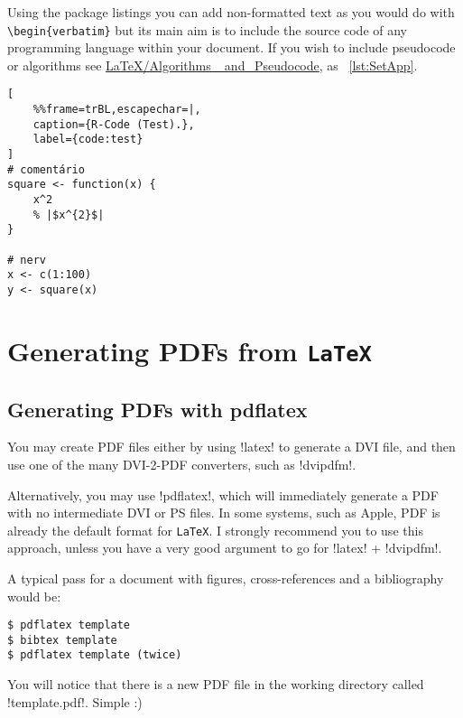 Using the package listings you can add non-formatted text as you would do with \verb!\begin{verbatim}! but its main aim is to include the source code of any programming language within your document. If you wish to include pseudocode or algorithms see \href{http://en.wikibooks.org/wiki/LaTeX/Algorithms_and_Pseudocode}{LaTeX/Algorithms\_ and\_Pseudocode}, as \lstlistingname ~\ref{lst:SetApp}.


\begin{minipage}{\textwidth}
\lstset{language=R,numbers=left}
\begin{lstlisting}[
    %%frame=trBL,escapechar=|,
    caption={R-Code (Test).},
    label={code:test}
]
# comentário
square <- function(x) {
    x^2
    % |$x^{2}$|
}

# nerv
x <- c(1:100)
y <- square(x)
\end{lstlisting}
\end{minipage}
\section{Generating PDFs from \texttt{LaTeX}} %
\label{sec:generating_pdfs_from_latex}

\subsection{Generating PDFs with pdflatex} %
\label{ssec:generating_pdfs_with_pdflatex}

You may create PDF files either by using \spverb!latex! to generate a DVI file, and then use one of the many DVI-2-PDF converters, such as \spverb!dvipdfm!.

Alternatively, you may use \spverb!pdflatex!, which will immediately generate a PDF with no intermediate DVI or PS files. In some systems, such as Apple, PDF is already the default format for \texttt{LaTeX}. I strongly recommend you to use this approach, unless you have a very good argument to go for \spverb!latex! + \spverb!dvipdfm!.

A typical pass for a document with figures, cross-references and a bibliography would be:
\begin{verbatim}
$ pdflatex template
$ bibtex template
$ pdflatex template (twice)
\end{verbatim}
\begin{sloppypar}
You will notice that there is a new PDF file in the working directory called \spverb!template.pdf!. Simple :)
\end{sloppypar}


